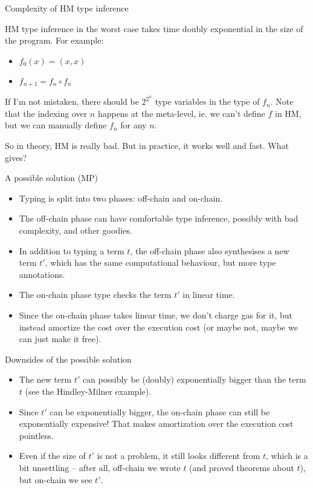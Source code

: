 \documentclass{beamer}
\begin{document}
\begin{frame}{Complexity of HM type inference}

HM type inference  in the worst case takes time doubly exponential in the size of the program. For example:

\begin{itemize}
  \item $f_0(x) = (x, x)$
  \item $f_{n + 1} = f_n \circ f_n$
\end{itemize}

\vspace{2em}

If I'm not mistaken, there should be $2^{2^n}$ type variables in the type of $f_n$. Note that the indexing over $n$ happens at the meta-level, ie. we can't define $f$ in HM, but we can manually define $f_n$ for any $n$.

\vspace{2em}

So in theory, HM is really bad. But in practice, it works well and fast. What gives?

\end{frame}

\begin{frame}{A possible solution (MP)}

\begin{itemize}
  \item Typing is split into two phases: off-chain and on-chain.
  \item The off-chain phase can have comfortable type inference, possibly with bad complexity, and other goodies.
  \item In addition to typing a term $t$, the off-chain phase also synthesises a new term $t'$, which has the same computational behaviour, but more type annotations.
  \item The on-chain phase type checks the term $t'$ in linear time.
  \item Since the on-chain phase takes linear time, we don't charge gas for it, but instead amortize the cost over the execution cost (or maybe not, maybe we can just make it free).
\end{itemize}

\end{frame}

\begin{frame}{Downsides of the possible solution}

\begin{itemize}
  \item The new term $t'$ can possibly be (doubly) exponentially bigger than the term $t$ (see the Hindley-Milner example).
  \item Since $t'$ can be exponentially bigger, the on-chain phase can still be exponentially expensive! That makes amortization over the execution cost pointless.
  \item Even if the size of $t'$ is not a problem, it still looks different from $t$, which is a bit unsettling -- after all, off-chain we wrote $t$ (and proved theorems about $t$), but on-chain we see $t'$.
\end{itemize}

\end{frame}
\end{document}
